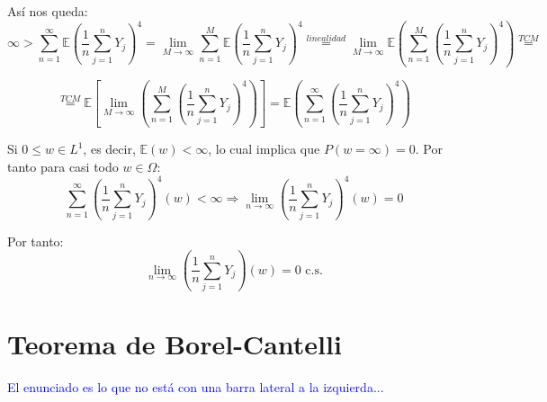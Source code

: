 \documentclass{apuntes}
\begin{document}
Así nos queda:
\[
\infty > \sum_{n=1}^{\infty}\mathbb{E}(\frac{1}{n}\sum_{j=1}^{n}Y_j)^4 = \lim_{M \rightarrow \infty}\sum_{n=1}^{M}\mathbb{E}(\frac{1}{n}\sum_{j=1}^{n}Y_j)^4 \stackrel{linealidad}{=} \lim_{M \rightarrow \infty} \mathbb{E}\left(\sum_{n=1}^{M}(\frac{1}{n}\sum_{j=1}^{n}Y_j)^4 \right) \stackrel{TCM}{=}
\]

\[
\stackrel{TCM}{=} \mathbb{E}\left[\lim_{M \rightarrow \infty}\left(\sum_{n=1}^{M}(\frac{1}{n}\sum_{j=1}^{n} Y_j)^4 \right)  \right] = \mathbb{E}\left(\sum_{n=1}^{\infty}(\frac{1}{n}\sum_{j=1}^{n} Y_j)^4 \right)
\]

Si $0 \leq w \in L^1$, es decir, $\mathbb{E}(w) < \infty$, lo cual implica que $P(w = \infty)=0$. Por tanto para casi todo $w \in \Omega$:
\[
\sum_{n=1}^{\infty}(\frac{1}{n}\sum_{j=1}^{n}Y_j)^4 (w) < \infty  \Rightarrow \lim_{n \rightarrow \infty}(\frac{1}{n}\sum_{j=1}^{n}Y_j)^4 (w) = 0
\]

Por tanto:
\[
\lim_{n \rightarrow \infty}(\frac{1}{n}\sum_{j=1}^{n}Y_j) (w) = 0 \text{ c.s.}
\]

\section{Teorema de Borel-Cantelli}
\textcolor{blue}{El enunciado es lo que no está con una barra lateral a la izquierda...}
\end{document}
